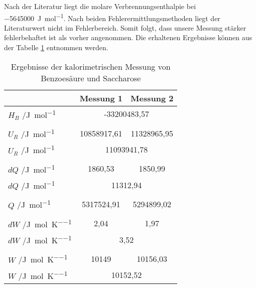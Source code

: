 Nach der Literatur \cite{atkins} liegt die molare Verbrennungsenthalpie bei \qty{-5645000}{\joule\per\mole}.
Nach beiden Fehlerermittlungsmethoden liegt der Literaturwert nicht im Fehlerbereich. 
Somit folgt, dass unsere Messung stärker fehlerbehaftet ist als vorher angenommen.
Die erhaltenen  Ergebnisse können aus der Tabelle \ref{tab:erg} entnommen werden.
\begin{table}[h!]
\centering
\begin{tabular}{l|cc}
	& Messung 1 & Messung 2\\
\hline
$H_B$  /\unit{\joule\per\mole} 		& \multicolumn{2}{c}{-33200483,57}\\\\
$U_R$  /\unit{\joule\per\mole} 		& 10858917,61    & 11328965,95\\
$U_R$  /\unit{\joule\per\mole} 		& \multicolumn{2}{c}{11093941,78}\\\\
$dQ$  /\unit{\joule\per\mole} 		& 1860,53        & 1850,99\\
$dQ$  /\unit{\joule\per\mole} 		& \multicolumn{2}{c}{11312,94}\\\\
$Q$   /\unit{\joule\per\mole} 		& 5317524,91     & 5294899,02\\\\
$dW$  /\unit{\joule\per\mole\per\kelvin}	& 2,04           & 1,97\\
$dW$  /\unit{\joule\per\mole\per\kelvin} 	& \multicolumn{2}{c}{3,52}\\\\
$W$   /\unit{\joule\per\mole\per\kelvin}	& 10149          & 10156,03\\
$W$   /\unit{\joule\per\mole\per\kelvin}	& \multicolumn{2}{c}{10152,52}\\
\end{tabular}
\caption{Ergebnisse der kalorimetrischen Messung von Benzoesäure und Saccharose}
\label{tab:erg}
\end{table}
